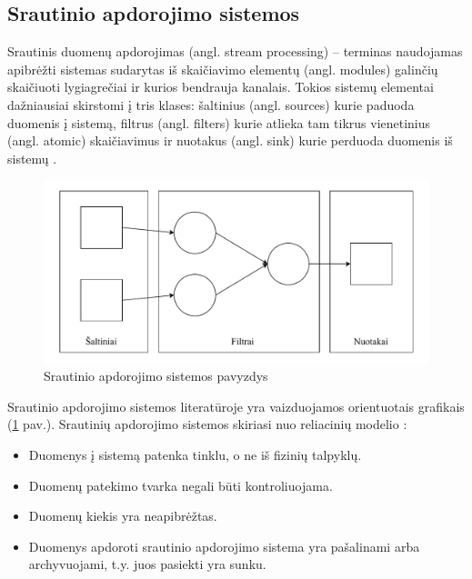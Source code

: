 \documentclass{VUMIFPSbakalaurinis}
\begin{document}
\subsection{Srautinio apdorojimo sistemos}
Srautinis duomenų apdorojimas (angl. stream processing) – terminas naudojamas apibrėžti sistemas sudarytas iš skaičiavimo elementų (angl. modules) galinčių skaičiuoti lygiagrečiai ir kurios bendrauja kanalais. Tokios sistemų elementai dažniausiai skirstomi į tris klases: šaltinius (angl. sources) kurie paduoda duomenis į sistemą, filtrus (angl. filters) kurie atlieka tam tikrus vienetinius (angl. atomic) skaičiavimus ir nuotakus (angl. sink) kurie perduoda duomenis iš sistemų \cite{stephens1997survey}. 
\begin{figure}[H]
    \includegraphics[width=15cm]{img/Srautinio apdorojimo sistema.pdf}
    \caption{Srautinio apdorojimo sistemos pavyzdys}
    \label{srautinio-apdorojimo-sistema}
\end{figure} 
Srautinio apdorojimo sistemos literatūroje yra vaizduojamos orientuotais grafikais (\ref{srautinio-apdorojimo-sistema} pav.). Srautinių apdorojimo sistemos skiriasi nuo reliacinių modelio \cite{babcock2002models}: 
\begin{itemize}
    \item Duomenys į sistemą patenka tinklu, o ne iš fizinių talpyklų.
    \item Duomenų patekimo tvarka negali būti kontroliuojama.
    \item Duomenų kiekis yra neapibrėžtas.
    \item Duomenys apdoroti srautinio apdorojimo sistema yra pašalinami arba archyvuojami, t.y. juos pasiekti yra sunku. 
\end{itemize}
\end{document}
